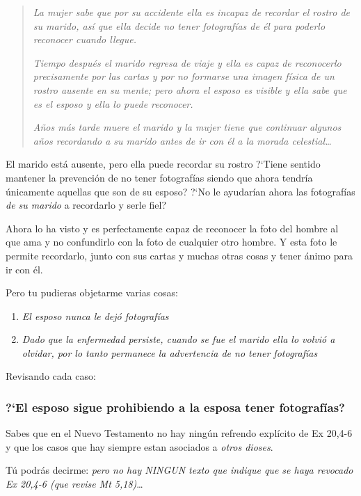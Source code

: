 \documentclass{article}
\begin{document}
\begin{quote}
\emph{La mujer sabe que por su accidente ella es incapaz de recordar el rostro de su marido, as\'{i} que ella decide no tener fotograf\'{i}as de \'el para poderlo reconocer cuando llegue.}

\emph{Tiempo despu\'es el marido regresa de viaje y ella es capaz de reconocerlo precisamente por las cartas y por no formarse una imagen f\'{i}sica de un rostro ausente en su mente; pero ahora el esposo es visible y ella sabe que es el esposo y ella lo puede reconocer.}

\emph{A\~nos m\'as tarde muere el marido y la mujer tiene que continuar algunos a\~nos recordando a su marido antes de ir con \'el a la morada celestial\ldots}
\end{quote}

\noindent
El marido est\'a ausente, pero ella puede recordar su rostro ?`Tiene sentido mantener la prevenci\'on de no tener fotograf\'{i}as siendo que ahora tendr\'{i}a \'unicamente aquellas que son de su esposo? ?`No le ayudar\'{i}an ahora las fotograf\'{i}as \emph{de su marido} a recordarlo y serle fiel?

Ahora lo ha visto y es perfectamente capaz de reconocer la foto del hombre al que ama y no confundirlo con la foto de cualquier otro hombre. Y esta foto le permite recordarlo, junto con sus cartas y muchas otras cosas y tener \'animo para ir con \'el.

Pero tu pudieras objetarme varias cosas:

\begin{enumerate}
\item \emph{El esposo nunca le dej\'o fotograf\'{i}as}
\item \emph{Dado que la enfermedad persiste, cuando se fue el marido ella lo volvi\'o a olvidar, por lo tanto permanece la advertencia de no tener fotograf\'{i}as}
\end{enumerate}

Revisando cada caso:

\subsubsection{?`El esposo sigue prohibiendo a la esposa tener fotograf\'{i}as?}

Sabes que en el Nuevo Testamento no hay ning\'un refrendo expl\'{i}cito de Ex 20,4-6 y que los casos que hay siempre estan asociados a \emph{otros dioses}.

T\'u podr\'as decirme: \emph{pero no hay NINGUN texto que indique que se haya revocado Ex 20,4-6 (que revise Mt 5,18)}\ldots
\end{document}
